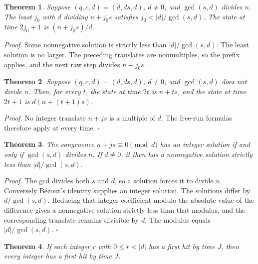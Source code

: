 \documentclass[11pt,letterpaper]{article}
\newtheorem{theorem}{Theorem}
\newenvironment{proof}{\noindent\textit{Proof.}}{\hfill\(\square\)}
\begin{document}
\begin{theorem}
\label{thm:leasthit}
Suppose \((q,c,d)=(d,ds,d)\), \(d\ne0\), and \(\gcd(s,d)\) divides \(n\). The least \(j_{0}\) with \(d\) dividing \(n+j_{0}s\) satisfies \(j_{0}<|d|/\gcd(s,d)\). The state at time \(2j_{0}+1\) is \((n+j_{0}s)/d\).
\end{theorem}

\begin{proof}
Some nonnegative solution is strictly less than \(|d|/\gcd(s,d)\). The least solution is no larger. The preceding translates are nonmultiples, so the prefix applies, and the next raw step divides \(n+j_{0}s\).
\end{proof}

\begin{theorem}
\label{thm:forever}
Suppose \((q,c,d)=(d,ds,d)\), \(d\ne0\), and \(\gcd(s,d)\) does not divide \(n\). Then, for every \(t\), the state at time \(2t\) is \(n+ts\), and the state at time \(2t+1\) is \(d(n+(t+1)s)\).
\end{theorem}

\begin{proof}
No integer translate \(n+js\) is a multiple of \(d\). The free-run formulas therefore apply at every time.
\end{proof}

\begin{theorem}
\label{thm:translatehit}
The congruence \(n+js\equiv 0\pmod{d}\) has an integer solution if and only if \(\gcd(s,d)\) divides \(n\). If \(d\ne 0\), it then has a nonnegative solution strictly less than \(|d|/\gcd(s,d)\).
\end{theorem}

\begin{proof}
The gcd divides both \(s\) and \(d\), so a solution forces it to divide \(n\). Conversely Bézout's identity supplies an integer solution. The solutions differ by \(d/\gcd(s,d)\). Reducing that integer coefficient modulo the absolute value of the difference gives a nonnegative solution strictly less than that modulus, and the corresponding translate remains divisible by \(d\). The modulus equals \(|d|/\gcd(s,d)\).
\end{proof}

\begin{theorem}
\label{thm:residues}
If each integer \(r\) with \(0\le r<\lvert d\rvert\) has a first hit by time \(J\), then every integer has a first hit by time \(J\).
\end{theorem}
\end{document}
